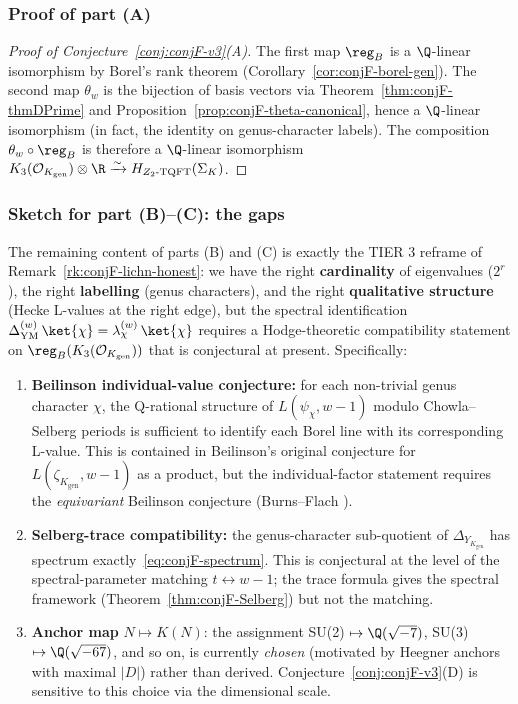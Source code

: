 \subsubsection{Proof of part (A)}
\label{sec:conjF-proof-A}

\begin{proof}[Proof of Conjecture~\ref{conj:conjF-v3}(A)]
The first map $\reg_B$ is a $\Q$-linear isomorphism by Borel's
rank theorem (Corollary~\ref{cor:conjF-borel-gen}).  The second map
$\theta_w$ is the bijection of basis vectors via
Theorem~\ref{thm:conjF-thmDPrime} and
Proposition~\ref{prop:conjF-theta-canonical}, hence a $\Q$-linear
isomorphism (in fact, the identity on genus-character labels).
The composition $\theta_w \circ \reg_B$ is therefore a
$\Q$-linear isomorphism
$K_3(\mathcal{O}_{K_{\mathrm{gen}}}) \otimes \R \xrightarrow{\sim}
H_{Z_2\text{-}\mathrm{TQFT}}(\Sigma_K)$.
\end{proof}

\subsubsection{Sketch for part (B)--(C): the gaps}
\label{sec:conjF-proof-BC}

The remaining content of parts (B) and (C) is exactly the TIER 3
reframe of Remark~\ref{rk:conjF-lichn-honest}: we have the right
{\bf cardinality} of eigenvalues ($2^r$), the right {\bf labelling}
(genus characters), and the right {\bf qualitative structure}
(Hecke L-values at the right edge), but the spectral identification
$\Delta_{\mathrm{YM}}^{(w)}\,\ket{\chi} = \lambda_\chi^{(w)}\,
\ket{\chi}$ requires a Hodge-theoretic compatibility statement on
$\reg_B(K_3(\mathcal{O}_{K_{\mathrm{gen}}}))$ that is conjectural at
present.  Specifically:

\begin{enumerate}[label=(B\arabic*),leftmargin=*]
\item {\bf Beilinson individual-value conjecture:} for each
   non-trivial genus character $\chi$, the Q-rational structure of
   $L(\psi_\chi, w-1)$ modulo Chowla--Selberg periods is sufficient
   to identify each Borel line with its corresponding L-value.  This
   is contained in Beilinson's original conjecture
   \cite[Conj.~3.4]{Beilinson1985} for $L(\zeta_{K_{\mathrm{gen}}},
   w-1)$ as a product, but the individual-factor statement requires
   the {\em equivariant} Beilinson conjecture (Burns--Flach
   \cite{BurnsFlach2001}).
\item {\bf Selberg-trace compatibility:} the genus-character
   sub-quotient of $\Delta_{Y_{K_{\mathrm{gen}}}}$ has spectrum
   exactly~\eqref{eq:conjF-spectrum}.  This is conjectural at the
   level of the spectral-parameter matching $t \leftrightarrow w-1$;
   the trace formula gives the spectral framework
   (Theorem~\ref{thm:conjF-Selberg}) but not the matching.
\item {\bf Anchor map} $N \mapsto K(N)$: the assignment SU(2) $\mapsto
   \Q(\sqrt{-7})$, SU(3) $\mapsto \Q(\sqrt{-67})$, and so on, is
   currently {\em chosen} (motivated by Heegner anchors with maximal
   $|D|$) rather than derived.  Conjecture~\ref{conj:conjF-v3}(D) is
   sensitive to this choice via the dimensional scale.
\end{enumerate}

